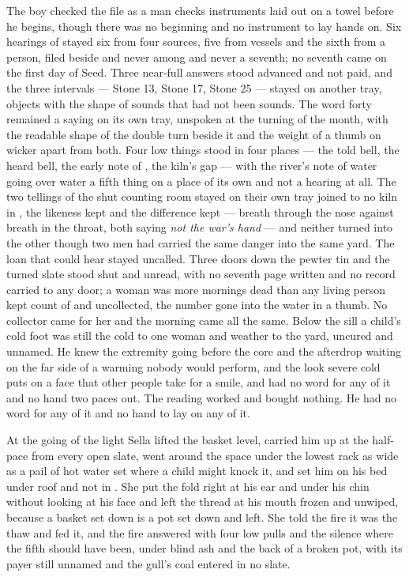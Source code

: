 The boy checked the file as a man checks instruments laid out on a towel before he begins, though there was no beginning and no instrument to lay hands on. Six hearings of  stayed six from four sources, five from vessels and the sixth from a person, filed beside and never among and never a seventh; no seventh came on the first day of Seed. Three near-full answers stood advanced and not paid, and the three intervals --- Stone 13, Stone 17, Stone 25 --- stayed on another tray, objects with the shape of sounds that had not been sounds. The word forty remained a saying on its own tray, unspoken at the turning of the month, with the readable shape of the double turn beside it and the weight of a thumb on wicker apart from both. Four low things stood in four places --- the told bell, the heard bell, the early note of , the kiln's gap --- with the river's note of water going over water a fifth thing on a place of its own and not a hearing at all. The two tellings of the shut counting room stayed on their own tray joined to no kiln in , the likeness kept and the difference kept --- breath through the nose against breath in the throat, both saying \emph{not the war's hand} --- and neither turned into the other though two men had carried the same danger into the same yard. The loan that could hear stayed uncalled. Three doors down the pewter tin and the turned slate stood shut and unread, with no seventh page written and no record carried to any door; a woman was more mornings dead than any living person kept count of and uncollected, the number gone into the water in a thumb. No collector came for her and the morning came all the same. Below the sill a child's cold foot was still the cold to one woman and weather to the yard, uncured and unnamed. He knew the extremity going before the core and the afterdrop waiting on the far side of a warming nobody would perform, and the look severe cold puts on a face that other people take for a smile, and had no word for any of it and no hand two paces out. The reading worked and bought nothing. He had no  word for any of it and no hand to lay on any of it.

At the going of the light Sella lifted the basket level, carried him up at the half-pace from every open slate, went around the space under the lowest rack as wide as a pail of hot water set where a child might knock it, and set him on his bed under  roof and not in . She put the fold right at his ear and under his chin without looking at his face and left the thread at his mouth frozen and unwiped, because a basket set down is a pot set down and left. She told the fire it was the thaw and fed it, and the fire answered with four low pulls and the silence where the fifth should have been, under blind ash and the back of a broken pot, with its payer still unnamed and the gull's coal entered in no slate.

